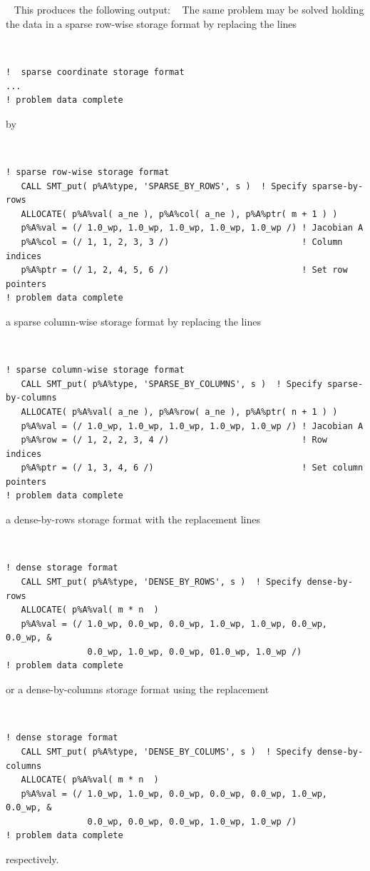 \documentclass{galahad}
\begin{document}
{\tt \small
\VerbatimInput{\packageexample}
}
\noindent
This produces the following output: \vspace*{-2mm}
{\tt \small
\VerbatimInput{\packageresults}
}
\noindent
The same problem may be solved holding the data in
a sparse row-wise storage format by replacing the lines
{\tt \small
\begin{verbatim}
!  sparse coordinate storage format
...
! problem data complete
\end{verbatim}
}
\noindent
by
{\tt \small
\begin{verbatim}
! sparse row-wise storage format
   CALL SMT_put( p%A%type, 'SPARSE_BY_ROWS', s )  ! Specify sparse-by-rows
   ALLOCATE( p%A%val( a_ne ), p%A%col( a_ne ), p%A%ptr( m + 1 ) )
   p%A%val = (/ 1.0_wp, 1.0_wp, 1.0_wp, 1.0_wp, 1.0_wp /) ! Jacobian A
   p%A%col = (/ 1, 1, 2, 3, 3 /)                          ! Column indices
   p%A%ptr = (/ 1, 2, 4, 5, 6 /)                          ! Set row pointers
! problem data complete
\end{verbatim}
}
\noindent
a sparse column-wise storage format by replacing the lines
{\tt \small
\begin{verbatim}
! sparse column-wise storage format
   CALL SMT_put( p%A%type, 'SPARSE_BY_COLUMNS', s )  ! Specify sparse-by-columns
   ALLOCATE( p%A%val( a_ne ), p%A%row( a_ne ), p%A%ptr( n + 1 ) )
   p%A%val = (/ 1.0_wp, 1.0_wp, 1.0_wp, 1.0_wp, 1.0_wp /) ! Jacobian A
   p%A%row = (/ 1, 2, 2, 3, 4 /)                          ! Row indices
   p%A%ptr = (/ 1, 3, 4, 6 /)                             ! Set column pointers
! problem data complete
\end{verbatim}
}
\noindent
a dense-by-rows storage format with the replacement lines
{\tt \small
\begin{verbatim}
! dense storage format
   CALL SMT_put( p%A%type, 'DENSE_BY_ROWS', s )  ! Specify dense-by-rows
   ALLOCATE( p%A%val( m * n  )
   p%A%val = (/ 1.0_wp, 0.0_wp, 0.0_wp, 1.0_wp, 1.0_wp, 0.0_wp, 0.0_wp, &
                0.0_wp, 1.0_wp, 0.0_wp, 01.0_wp, 1.0_wp /)
! problem data complete
\end{verbatim}
}
\noindent
or a dense-by-columns storage format using the replacement
{\tt \small
\begin{verbatim}
! dense storage format
   CALL SMT_put( p%A%type, 'DENSE_BY_COLUMS', s )  ! Specify dense-by-columns
   ALLOCATE( p%A%val( m * n  )
   p%A%val = (/ 1.0_wp, 1.0_wp, 0.0_wp, 0.0_wp, 0.0_wp, 1.0_wp, 0.0_wp, &
                0.0_wp, 0.0_wp, 0.0_wp, 1.0_wp, 1.0_wp /)
! problem data complete
\end{verbatim}
}
\noindent
respectively.
\end{document}
